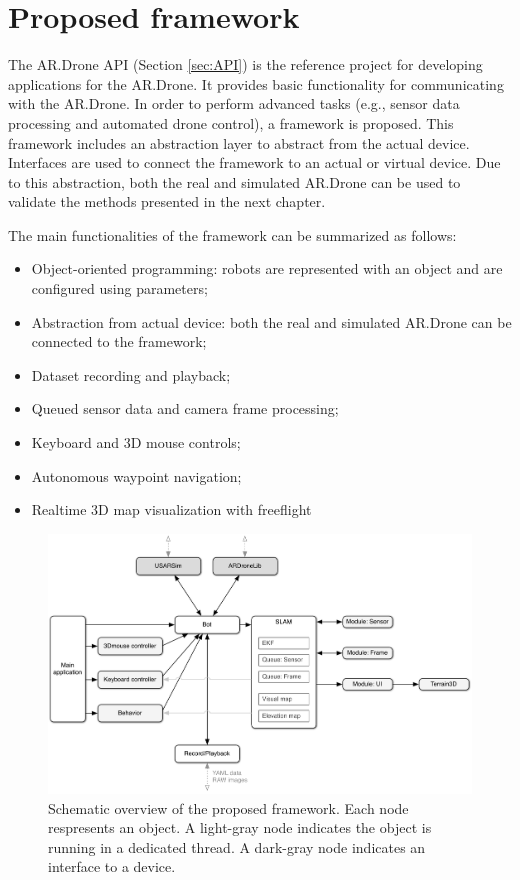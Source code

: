 \section{Proposed framework}
\label{sec:proposed-framework}
The AR.Drone API (Section \ref{sec:API}) is the reference project for developing applications for the AR.Drone.
It provides basic functionality for communicating with the AR.Drone.
In order to perform advanced tasks (e.g., sensor data processing and automated drone control), a framework is proposed.
This framework includes an abstraction layer to abstract from the actual device.
Interfaces are used to connect the framework to an actual or virtual device.
Due to this abstraction, both the real and simulated AR.Drone can be used to validate the methods presented in the next chapter.

The main functionalities of the framework can be summarized as follows:
\begin{itemize}
\item Object-oriented programming: robots are represented with an object and are configured using parameters;
\item Abstraction from actual device: both the real and simulated AR.Drone can be connected to the framework;
\item Dataset recording and playback;
\item Queued sensor data and camera frame processing;
\item Keyboard and 3D mouse controls;
\item Autonomous waypoint navigation;
\item Realtime 3D map visualization with freeflight
\end{itemize}

\begin{figure}[htb!]
\centering
\includegraphics[width=\linewidth]{images/framework.pdf}
\caption{Schematic overview of the proposed framework. Each node respresents an object. A light-gray node indicates the object is running in a dedicated thread. A dark-gray node indicates an interface to a device.} 
\label{fig:proposed_framework_schematic}
\end{figure}

